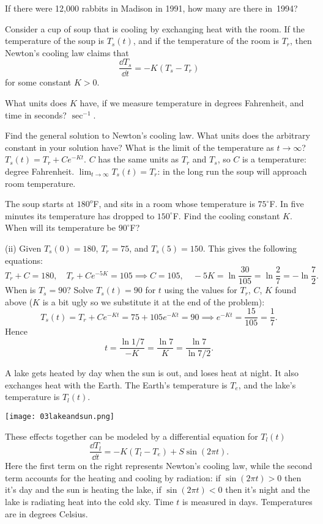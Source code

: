 \begin{multicols}{2}
\subprob If there were 12,000 rabbits in Madison in 1991, how many are
there in~1994?


\problem \groupproblem %
Consider a cup of soup that is cooling by exchanging heat with the room.
If the temperature of the soup is $T_s(t)$, and if the temperature of the room is
$T_r$, then Newton's cooling law claims that
\[
\frac{\dd T_s} {\dd t} = -K (T_s- T_r)
\]
for some constant $K>0$.

\subprob What units does $K$ have, if we measure temperature in degrees Fahrenheit,
and time in seconds?
\answer %
$\sec^{-1}$.
\endanswer

\subprob Find the general solution to Newton's cooling law.  What units does the
arbitrary constant in your solution have?  What is the limit of
the temperature as $t\to\infty$?
\answer %
$T_s(t) = T_r + C e^{-Kt}$.  $C$ has the same units as $T_r$ and $T_s$, so $C$ is a
temperature:  degree Fahrenheit.  $\lim_{t\to\infty} T_s(t) = T_r$: in the long run
the soup will approach room temperature.
\endanswer

\subprob The soup starts at  $180^o$F, and sits in a room whose temperature is
$75^\circ$F.  In five minutes its temperature has dropped to $150^\circ$F.  Find the
cooling constant $K$.  When will its temperature be $90^\circ$F?
\answer %

(ii) Given $T_s(0) = 180$, $T_r=75$, and $T_s(5) = 150$. This gives the following
equations:
\[
T_r + C = 180, \quad T_r + Ce^{-5K} = 105
\implies C= 105, \quad -5K = \ln\frac{30}{105} =\ln\frac{2}{7}=-\ln\frac72.
\]
When is $T_s=90$?  Solve $T_s(t) = 90$ for $t$ using the values for $T_r$, $C$, $K$
found above ($K$ is a bit ugly so we substitute it at the end of the
problem):
\[
T_s(t) = T_r+Ce^{-Kt} = 75+105 e^{-Kt} = 90 \implies e^{-Kt} =
\frac{15}{105} = \frac{1}{7}.
\]
Hence
\[
t = \frac{\ln 1/7}{-K} = \frac{\ln 7}{K} = \frac{\ln 7}{\ln 7/2}.
\]

\endanswer

\problem \groupproblem A lake gets heated by day when the sun is out, and loses %
heat at night.  It also exchanges heat with the Earth.  The Earth's temperature
is $T_e$, and the lake's temperature is $T_l(t)$.  

\texttt{[image: 03lakeandsun.png]}

\noindent%
These effects together can be
modeled by a differential equation for $T_l(t)$
\[
\frac{\dd T_l} {\dd t}  = -K(T_l - T_e) + S \sin(2\pi t).
\]
Here the first term on the right represents Newton's cooling law, while the second
term accounts for the heating and cooling by radiation: if $\sin(2\pi t)>0$ then it's
day and the sun is heating the lake, if $\sin(2\pi t)<0$ then it's night and the lake
is radiating heat into the cold sky.  Time $t$ is measured in days. Temperatures are
in degrees Celsius.


\end{multicols}
